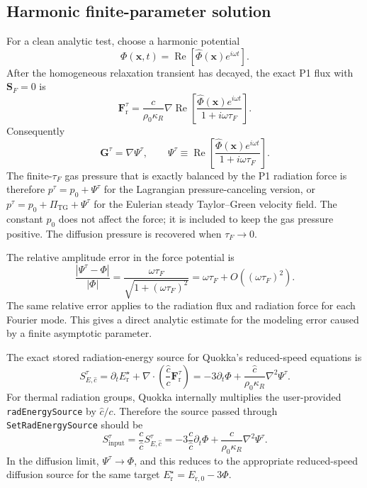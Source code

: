 \documentclass[11pt]{article}
\newcommand{\Div}{\nabla\!\cdot}
\newcommand{\Grad}{\nabla}
\newcommand{\Er}{E_{\mathrm r}}
\newcommand{\Fr}{\bm{F}_{\mathrm r}}
\newcommand{\Gmom}{\bm{G}}
\newcommand{\ShatF}{\bm{S}_F}
\newcommand{\chat}{\hat{c}}
\newcommand{\Erzero}{E_{\mathrm r,0}}
\newcommand{\SErsla}{S_{E,\hat{c}}}
\begin{document}
\subsection{Harmonic finite-parameter solution}

For a clean analytic test, choose a harmonic potential
\begin{equation}
  \Phi(\bm{x},t) = \operatorname{Re}\left[\widehat{\Phi}(\bm{x})e^{i\omega t}\right].
  \label{eq:harmonic-potential}
\end{equation}
After the homogeneous relaxation transient has decayed, the exact P1 flux with
\(\ShatF=0\) is
\begin{equation}
  \Fr^\tau
  =
  \frac{c}{\rho_0\kappa_R}
  \Grad
  \operatorname{Re}\left[
    \frac{\widehat{\Phi}(\bm{x})e^{i\omega t}}{1+i\omega\tau_F}
  \right].
  \label{eq:harmonic-flux}
\end{equation}
Consequently
\begin{equation}
  \Gmom^\tau
  =
  \Grad\Psi^\tau,
  \qquad
  \Psi^\tau
  \equiv
  \operatorname{Re}\left[
    \frac{\widehat{\Phi}(\bm{x})e^{i\omega t}}{1+i\omega\tau_F}
  \right].
  \label{eq:harmonic-force-potential}
\end{equation}
The finite-\(\tau_F\) gas pressure that is exactly balanced by the P1
radiation force is therefore \(p^\tau=p_0+\Psi^\tau\) for the Lagrangian
pressure-canceling version, or
\(p^\tau=p_0+\Pi_{\mathrm{TG}}+\Psi^\tau\) for the Eulerian steady
Taylor--Green velocity field.  The constant \(p_0\) does not affect the force;
it is included to keep the gas pressure positive.  The diffusion pressure is
recovered when \(\tau_F\to0\).

The relative amplitude error in the force potential is
\begin{equation}
  \frac{\left|\Psi^\tau-\Phi\right|}{|\Phi|}
  =
  \frac{\omega\tau_F}{\sqrt{1+(\omega\tau_F)^2}}
  =
  \omega\tau_F + O((\omega\tau_F)^2).
  \label{eq:potential-error}
\end{equation}
The same relative error applies to the radiation flux and radiation force for
each Fourier mode.  This gives a direct analytic estimate for the modeling
error caused by a finite asymptotic parameter.

The exact stored radiation-energy source for Quokka's reduced-speed equations
is
\begin{equation}
  \SErsla^\tau
  =
  \partial_t\Er^\star
  + \Div\left(\frac{\chat}{c}\Fr^\tau\right)
  =
  -3\partial_t\Phi
  + \frac{\chat}{\rho_0\kappa_R}\nabla^2\Psi^\tau.
  \label{eq:finite-tau-stored-source}
\end{equation}
For thermal radiation groups, Quokka internally multiplies the user-provided
\texttt{radEnergySource} by \(\chat/c\).  Therefore the source passed through
\texttt{SetRadEnergySource} should be
\begin{equation}
  S_{\mathrm{input}}^\tau
  =
  \frac{c}{\chat}\SErsla^\tau
  =
  -3\frac{c}{\chat}\partial_t\Phi
  + \frac{c}{\rho_0\kappa_R}\nabla^2\Psi^\tau.
  \label{eq:finite-tau-input-source}
\end{equation}
In the diffusion limit, \(\Psi^\tau\to\Phi\), and this reduces to the
appropriate reduced-speed diffusion source for the same target
\(\Er^\star=\Erzero-3\Phi\).
\end{document}

